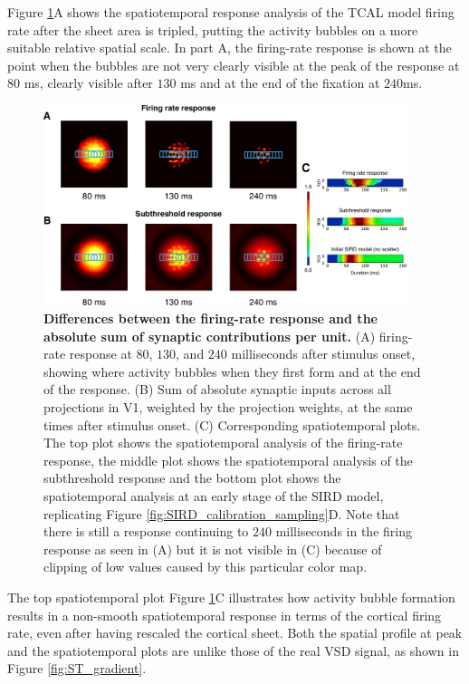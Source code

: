 \documentclass[phd,ianc,twoside]{infthesis}
\begin{document}
Figure \ref{fig:TCAL_SIRD_link}A shows the spatiotemporal response
analysis of the TCAL model firing rate after the sheet area is tripled,
putting the activity bubbles on a more suitable relative spatial
scale. In part A, the firing-rate response is shown at the point when
the bubbles are not very clearly visible at the peak of the response at
$80$ \si{\ms}, clearly visible after $130$ \si{\ms} and at the end of
the fixation at $240 $\si{\ms}.

\begin{figure}
\center
\includegraphics[width=0.95\textwidth]{./figures/TCAL_SIRD_link.pdf}
\caption{{\bf Differences between the firing-rate response and the absolute sum
    of synaptic contributions per unit.} (A) firing-rate response at
  $80$, $130$, and $240$ milliseconds after stimulus onset, showing
  where activity bubbles when they first form and at the end of the
  response. (B) Sum of absolute synaptic inputs across all projections
  in V1, weighted by the projection weights, at the same times after
  stimulus onset. (C) Corresponding spatiotemporal plots. The top plot
  shows the spatiotemporal analysis of the firing-rate response, the
  middle plot shows the spatiotemporal analysis of the subthreshold
  response and the bottom plot shows the spatiotemporal analysis at an
  early stage of the SIRD model, replicating Figure
  \ref{fig:SIRD_calibration_sampling}D. Note that there is still a
  response continuing to $240$ milliseconds in the firing response as seen in (A)
  but it is not visible in (C) because of clipping of low values
  caused by this particular color map. }
\label{fig:TCAL_SIRD_link}
\end{figure}


The top spatiotemporal plot Figure \ref{fig:TCAL_SIRD_link}C illustrates
how activity bubble formation results in a non-smooth spatiotemporal
response in terms of the cortical firing rate, even after having
rescaled the cortical sheet. Both the spatial profile at peak and the
spatiotemporal plots are unlike those of the real VSD signal, as shown
in Figure \ref{fig:ST_gradient}.
\end{document}
